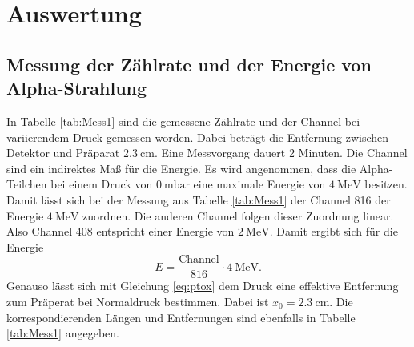 \section{Auswertung}
\label{sec:Auswertung}

\subsection{Messung der Zählrate und der Energie von Alpha-Strahlung}
In Tabelle \ref{tab:Mess1} sind die gemessene Zählrate und der Channel bei variierendem Druck gemessen worden.
Dabei beträgt die Entfernung zwischen Detektor und Präparat $\qty{2.3}{\centi\meter}$. Eine Messvorgang dauert 2 Minuten.
Die Channel sind ein indirektes Maß für die Energie. Es wird angenommen, dass die Alpha-Teilchen bei
einem Druck von $\qty{0}{\milli\bar}$ eine maximale Energie von $\qty{4}{\mega\electronvolt}$ besitzen.
Damit lässt sich bei der Messung aus Tabelle \ref{tab:Mess1} der Channel 816 der Energie $\qty{4}{\mega\electronvolt}$
zuordnen. Die anderen Channel folgen dieser Zuordnung linear. Also Channel 408 entspricht
einer Energie von $\qty{2}{\mega\electronvolt}$.
Damit ergibt sich für die Energie
\begin{equation}
  E=\frac{\text{Channel}}{816}\cdot \qty{4}{\mega\electronvolt}.
  \label{eq:En1}
\end{equation}
Genauso lässt sich mit Gleichung \eqref{eq:ptox} dem Druck eine effektive Entfernung zum Präperat
bei Normaldruck bestimmen. Dabei ist $x_0=\qty{2.3}{\centi\meter}$.
Die korrespondierenden Längen und Entfernungen sind ebenfalls in Tabelle \ref{tab:Mess1} angegeben.
